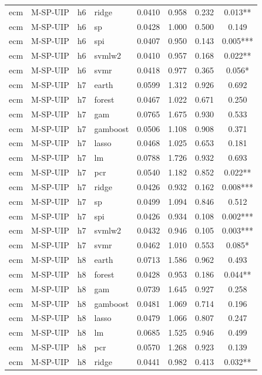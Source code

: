 \begin{ThreePartTable}
\begin{longtable}[t]{llclcccc}
ecm & M-SP-UIP & h6 & ridge & 0.0410 & 0.958 & 0.232 & 0.013**\\
ecm & M-SP-UIP & h6 & sp & 0.0428 & 1.000 & 0.500 & 0.149\\
ecm & M-SP-UIP & h6 & spi & 0.0407 & 0.950 & 0.143 & 0.005***\\
ecm & M-SP-UIP & h6 & svmlw2 & 0.0410 & 0.957 & 0.168 & 0.022**\\
ecm & M-SP-UIP & h6 & svmr & 0.0418 & 0.977 & 0.365 & 0.056*\\
\addlinespace
ecm & M-SP-UIP & h7 & earth & 0.0599 & 1.312 & 0.926 & 0.692\\
ecm & M-SP-UIP & h7 & forest & 0.0467 & 1.022 & 0.671 & 0.250\\
ecm & M-SP-UIP & h7 & gam & 0.0765 & 1.675 & 0.930 & 0.533\\
ecm & M-SP-UIP & h7 & gamboost & 0.0506 & 1.108 & 0.908 & 0.371\\
ecm & M-SP-UIP & h7 & lasso & 0.0468 & 1.025 & 0.653 & 0.181\\
ecm & M-SP-UIP & h7 & lm & 0.0788 & 1.726 & 0.932 & 0.693\\
ecm & M-SP-UIP & h7 & pcr & 0.0540 & 1.182 & 0.852 & 0.022**\\
ecm & M-SP-UIP & h7 & ridge & 0.0426 & 0.932 & 0.162 & 0.008***\\
ecm & M-SP-UIP & h7 & sp & 0.0499 & 1.094 & 0.846 & 0.512\\
ecm & M-SP-UIP & h7 & spi & 0.0426 & 0.934 & 0.108 & 0.002***\\
ecm & M-SP-UIP & h7 & svmlw2 & 0.0432 & 0.946 & 0.105 & 0.003***\\
ecm & M-SP-UIP & h7 & svmr & 0.0462 & 1.010 & 0.553 & 0.085*\\
\addlinespace
ecm & M-SP-UIP & h8 & earth & 0.0713 & 1.586 & 0.962 & 0.493\\
ecm & M-SP-UIP & h8 & forest & 0.0428 & 0.953 & 0.186 & 0.044**\\
ecm & M-SP-UIP & h8 & gam & 0.0739 & 1.645 & 0.927 & 0.258\\
ecm & M-SP-UIP & h8 & gamboost & 0.0481 & 1.069 & 0.714 & 0.196\\
ecm & M-SP-UIP & h8 & lasso & 0.0479 & 1.066 & 0.807 & 0.247\\
ecm & M-SP-UIP & h8 & lm & 0.0685 & 1.525 & 0.946 & 0.499\\
ecm & M-SP-UIP & h8 & pcr & 0.0570 & 1.268 & 0.923 & 0.139\\
ecm & M-SP-UIP & h8 & ridge & 0.0441 & 0.982 & 0.413 & 0.032**\\

\end{longtable}
\end{ThreePartTable}
